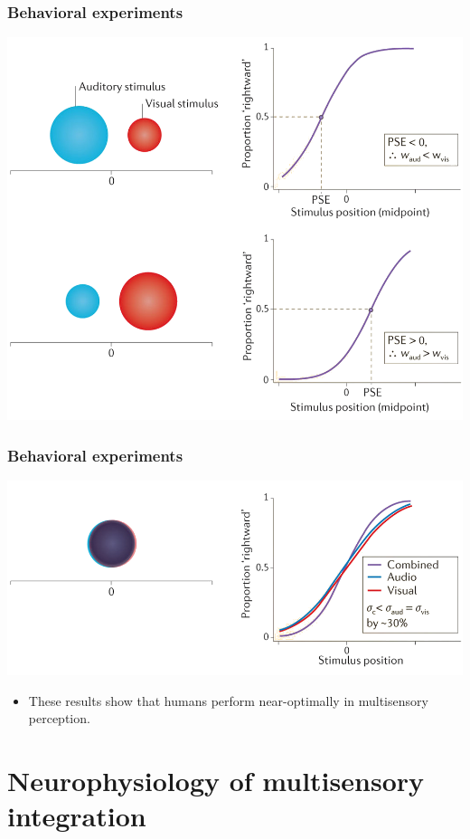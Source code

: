 \documentclass{beamer}
\begin{document}
\begin{frame}
  \frametitle{Behavioral experiments}
  \begin{center}
    \includegraphics[width=.9\textwidth]{visaudloc1}
  \end{center}
\end{frame}

\begin{frame}
  \frametitle{Behavioral experiments}
  \begin{center}
    \includegraphics[width=.9\textwidth]{visaudloc2}
  \end{center}
  \begin{itemize}
    \item These results show that humans perform near-optimally in multisensory perception.
  \end{itemize}
\end{frame}

\section{Neurophysiology of multisensory integration}
\end{document}
